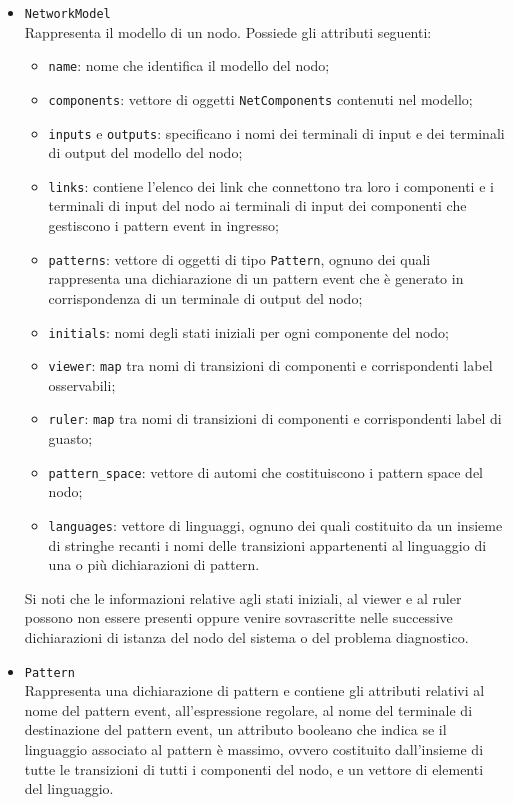 \begin{itemize}
\item \verb|NetworkModel|\\
Rappresenta il modello di un nodo. Possiede gli attributi seguenti:
\begin{itemize}
\item \verb|name|: nome che identifica il modello del nodo;
\item \verb|components|: vettore di oggetti \verb|NetComponents| contenuti nel modello;
\item \verb|inputs| e \verb|outputs|: specificano i nomi dei terminali di input e dei terminali di output del modello del nodo;
\item \verb|links|: contiene l'elenco dei link che connettono tra loro i componenti e i terminali di input del nodo ai terminali di input dei componenti che gestiscono i pattern event in ingresso;
\item \verb|patterns|: vettore di oggetti di tipo \verb|Pattern|, ognuno dei quali rappresenta una dichiarazione di un pattern event che è generato in corrispondenza di un terminale di output del nodo;
\item \verb|initials|: nomi degli stati iniziali per ogni componente del nodo;
\item \verb|viewer|: \verb|map| tra nomi di transizioni di componenti e corrispondenti label osservabili;
\item \verb|ruler|: \verb|map| tra nomi di transizioni di componenti e corrispondenti label di guasto;
\item \verb|pattern_space|: vettore di automi che costituiscono i pattern space del nodo;
\item \verb|languages|: vettore di linguaggi, ognuno dei quali costituito da un insieme di stringhe recanti i nomi delle transizioni appartenenti al linguaggio di una o più dichiarazioni di pattern.
\end{itemize}
Si noti che le informazioni relative agli stati iniziali, al viewer e al ruler possono non essere presenti oppure venire sovrascritte nelle successive dichiarazioni di istanza del nodo del sistema o del problema diagnostico.
\item \verb|Pattern|\\
Rappresenta una dichiarazione di pattern e contiene gli attributi relativi al nome del pattern event, all'espressione regolare, al nome del terminale di destinazione del pattern event, un attributo booleano che indica se il linguaggio associato al pattern è massimo, ovvero costituito dall'insieme di tutte le transizioni di tutti i componenti del nodo, e un vettore di elementi del linguaggio.

\end{itemize}
